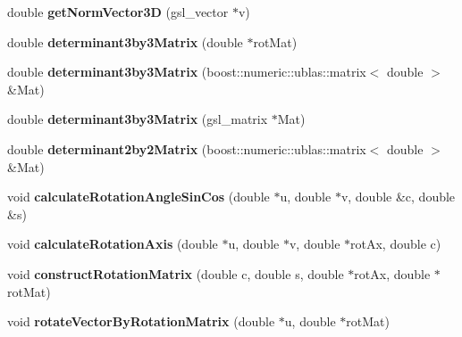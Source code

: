 \begin{DoxyCompactItemize}
\item 
\hypertarget{classShapeBase_a38c436dca2006e445f7949bc34f08e3c}{}double {\bfseries get\+Norm\+Vector3\+D} (gsl\+\_\+vector $\ast$v)\label{classShapeBase_a38c436dca2006e445f7949bc34f08e3c}

\item 
\hypertarget{classShapeBase_ade98a5910e7b81ee22da6bcb91262328}{}double {\bfseries determinant3by3\+Matrix} (double $\ast$rot\+Mat)\label{classShapeBase_ade98a5910e7b81ee22da6bcb91262328}

\item 
\hypertarget{classShapeBase_ad86161effaf1c7c607aba51609a99e70}{}double {\bfseries determinant3by3\+Matrix} (boost\+::numeric\+::ublas\+::matrix$<$ double $>$ \&Mat)\label{classShapeBase_ad86161effaf1c7c607aba51609a99e70}

\item 
\hypertarget{classShapeBase_af52dce091d2e8369f546df9adeb1e6c0}{}double {\bfseries determinant3by3\+Matrix} (gsl\+\_\+matrix $\ast$Mat)\label{classShapeBase_af52dce091d2e8369f546df9adeb1e6c0}

\item 
\hypertarget{classShapeBase_a32f1a594c4be91e71f567cc04290a7f5}{}double {\bfseries determinant2by2\+Matrix} (boost\+::numeric\+::ublas\+::matrix$<$ double $>$ \&Mat)\label{classShapeBase_a32f1a594c4be91e71f567cc04290a7f5}

\item 
\hypertarget{classShapeBase_a7c656b4d72103a222e3d9d4d4dc636ca}{}void {\bfseries calculate\+Rotation\+Angle\+Sin\+Cos} (double $\ast$u, double $\ast$v, double \&c, double \&s)\label{classShapeBase_a7c656b4d72103a222e3d9d4d4dc636ca}

\item 
\hypertarget{classShapeBase_acfd90d8e14946c7246e4420ca0ab6a0a}{}void {\bfseries calculate\+Rotation\+Axis} (double $\ast$u, double $\ast$v, double $\ast$rot\+Ax, double c)\label{classShapeBase_acfd90d8e14946c7246e4420ca0ab6a0a}

\item 
\hypertarget{classShapeBase_ac5ea30d81c19c9f7c904af66310c750b}{}void {\bfseries construct\+Rotation\+Matrix} (double c, double s, double $\ast$rot\+Ax, double $\ast$rot\+Mat)\label{classShapeBase_ac5ea30d81c19c9f7c904af66310c750b}

\item 
\hypertarget{classShapeBase_ad803a237b7e7c06d419a308625a599e0}{}void {\bfseries rotate\+Vector\+By\+Rotation\+Matrix} (double $\ast$u, double $\ast$rot\+Mat)\label{classShapeBase_ad803a237b7e7c06d419a308625a599e0}


\end{DoxyCompactItemize}
